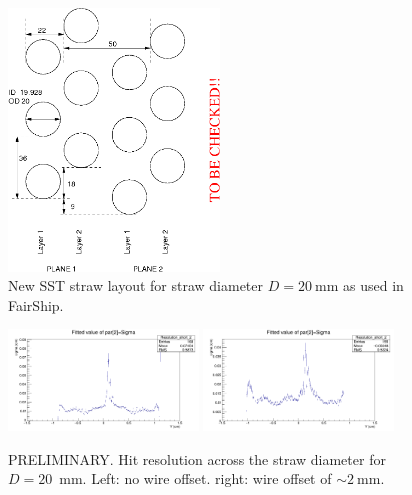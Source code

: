 \begin{figure}[htb]
\begin{center}
\includegraphics[width=0.5\textwidth]{figs/DecaySpectrometer/straw-layout-SHiP.png}
\caption{New SST straw layout for straw diameter $D=20~$mm as used in FairShip.}
\label{Fig:straw-layout-SHiP}
\end{center}
\end{figure}

\begin{figure}[htb]
\begin{center}
\includegraphics[width=0.45\textwidth]{figs/DecaySpectrometer/sigmaS_328.png} %
\includegraphics[width=0.45\textwidth]{figs/DecaySpectrometer/sigmaS_163.png} %
\caption{{\color{red} PRELIMINARY}. Hit resolution across the straw diameter for $D=20$~mm. 
Left: no wire offset. right: wire offset of $\sim 2~$mm.}
\label{Fig:straw_resolution_TB2017}
\end{center}
\end{figure}


